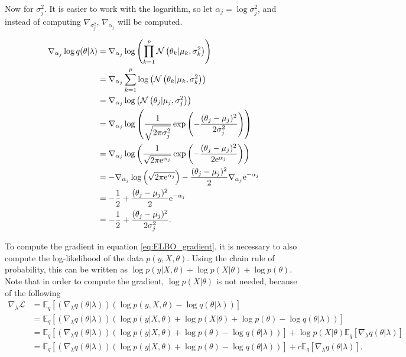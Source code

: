 Now for $\sigma_j^2$. It is easier to work with the logarithm, so let $\alpha_j = \log \sigma_j^2$, and instead of computing $\nabla_{\sigma_j^2}$, $\nabla_{\alpha_j}$ will be computed.

\begin{equation}
  \begin{split}
      \nabla_{\alpha_j} \log q(\theta | \lambda) & =
      \nabla_{\alpha_j} \log \left( \prod_{ k = 1}^p \mathcal{N}\left( \theta_k | \mu_k, \sigma_k^2 \right) \right) \\
      &= \nabla_{\alpha_j} \sum_{ k = 1}^p \log \left( \mathcal{N}\left( \theta_k | \mu_k, \sigma_k^2 \right) \right) \\
      &= \nabla_{\alpha_j} \log \left( \mathcal{N}\left( \theta_j | \mu_j, \sigma_j^2 \right) \right) \\
      &= \nabla_{\alpha_j} \log \left( \frac{1}{\sqrt{2 \pi \sigma_j^2}} \exp \left( -\frac{(\theta_j - \mu_j)^2}{2 \sigma_j^2} \right) \right) \\
      &= \nabla_{\alpha_j} \log \left( \frac{1}{\sqrt{2 \pi \mathrm{e}^{\alpha_j}}} \exp \left( -\frac{(\theta_j - \mu_j)^2}{2 \mathrm{e}^{\alpha_j}} \right) \right) \\
      &= - \nabla_{\alpha_j} \log \left( \sqrt{2 \pi \mathrm{e}^{\alpha_j}} \right) - \frac{(\theta_j - \mu_j)^2}{2} \nabla_{\alpha_j} \mathrm{e}^{-\alpha_j}\\
      &= - \frac{1}{2} + \frac{(\theta_j - \mu_j)^2}{2} \mathrm{e}^{-\alpha_j} \\
      &= - \frac{1}{2} + \frac{(\theta_j - \mu_j)^2}{2 \sigma_j^2}.
  \end{split}
\end{equation}

To compute the gradient in equation \ref{eq:ELBO_gradient}, it is necessary to also compute the log-likelihood of the data $p(y, X, \theta)$. Using the chain rule of probability, this can be written as $\log p(y | X, \theta) + \log p(X | \theta) + \log p(\theta)$. Note that in order to compute the gradient, $\log p(X | \theta)$ is not needed, because of the following
\begin{equation*}
  \begin{split}
      \nabla_{\lambda} \mathcal{L} &=
      \mathbb{E}_q \left[ \left( \nabla_{\lambda} q(\theta | \lambda) \right) \left( \log p(y, X, \theta) - \log q(\theta | \lambda) \right) \right] \\
      &= \mathbb{E}_q \left[ \left( \nabla_{\lambda} q(\theta | \lambda) \right) \left( \log p(y | X, \theta) + \log p(X | \theta) + \log p(\theta) - \log q(\theta | \lambda) \right) \right] \\
      &= \mathbb{E}_q \left[ \left( \nabla_{\lambda} q(\theta | \lambda) \right) \left( \log p(y | X, \theta) + \log p(\theta) - \log q(\theta | \lambda) \right) \right] +  \log p(X | \theta) \mathbb{E}_q \left[ \nabla_{\lambda} q(\theta | \lambda) \right] \\
      &= \mathbb{E}_q \left[ \left( \nabla_{\lambda} q(\theta | \lambda) \right) \left( \log p(y | X, \theta) + \log p(\theta) - \log q(\theta | \lambda) \right) \right] +  c \mathbb{E}_q \left[ \nabla_{\lambda} q(\theta | \lambda) \right].
  \end{split}
\end{equation*}

